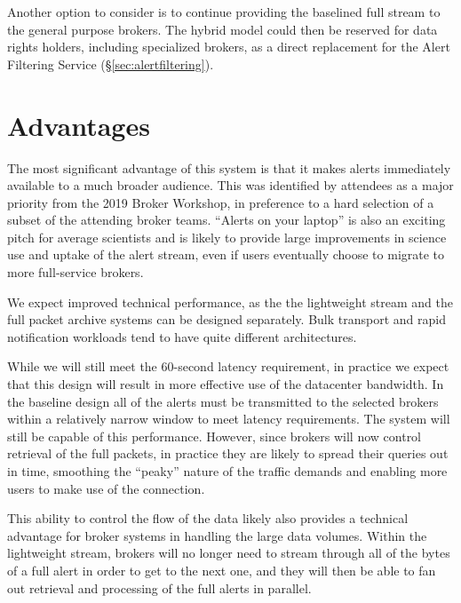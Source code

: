 \documentclass[DM,authoryear,toc]{lsstdoc}
\begin{document}
Another option to consider is to continue providing the baselined full stream to the general purpose brokers.
The hybrid model could then be reserved for data rights holders, including specialized brokers, as a direct replacement for the Alert Filtering Service (\S \ref{sec:alertfiltering}).

\section{Advantages}

The most significant advantage of this system is that it makes alerts immediately available to a much broader audience.
This was identified by attendees as a major priority from the 2019 Broker Workshop, in preference to a hard selection of a subset of the attending broker teams.
``Alerts on your laptop'' is also an exciting pitch for average scientists and is likely to provide large improvements in science use and uptake of the alert stream, even if users eventually choose to migrate to more full-service brokers.

We expect improved technical performance, as the the lightweight stream and the full packet archive systems can be designed separately.
Bulk transport and rapid notification workloads tend to have quite different architectures.

While we will still meet the 60-second latency requirement, in practice we expect that this design will result in more effective use of the datacenter bandwidth.
In the baseline design all of the alerts must be transmitted to the selected brokers within a relatively narrow window to meet latency requirements.
The system will still be capable of this performance.
However, since brokers will now control retrieval of the full packets, in practice they are likely to spread their queries out in time, smoothing the ``peaky'' nature of the traffic demands and enabling more users to make use of the connection.

This ability to control the flow of the data likely also provides a technical advantage for broker systems in handling the large data volumes.
Within the lightweight stream, brokers will no longer need to stream through all of the bytes of a full alert in order to get to the next one, and they will then be able to fan out retrieval and processing of the full alerts in parallel.
\end{document}

